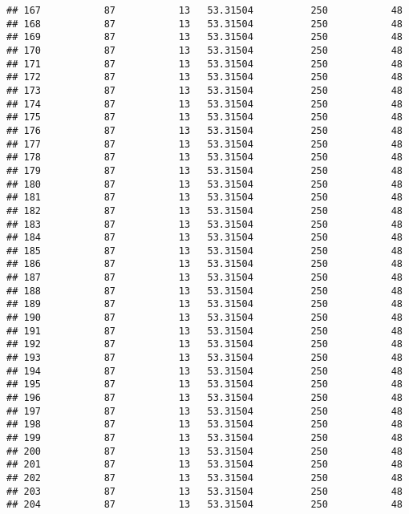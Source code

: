 \documentclass[]{article}
\begin{document}
\begin{verbatim}
## 167           87           13   53.31504          250           48
## 168           87           13   53.31504          250           48
## 169           87           13   53.31504          250           48
## 170           87           13   53.31504          250           48
## 171           87           13   53.31504          250           48
## 172           87           13   53.31504          250           48
## 173           87           13   53.31504          250           48
## 174           87           13   53.31504          250           48
## 175           87           13   53.31504          250           48
## 176           87           13   53.31504          250           48
## 177           87           13   53.31504          250           48
## 178           87           13   53.31504          250           48
## 179           87           13   53.31504          250           48
## 180           87           13   53.31504          250           48
## 181           87           13   53.31504          250           48
## 182           87           13   53.31504          250           48
## 183           87           13   53.31504          250           48
## 184           87           13   53.31504          250           48
## 185           87           13   53.31504          250           48
## 186           87           13   53.31504          250           48
## 187           87           13   53.31504          250           48
## 188           87           13   53.31504          250           48
## 189           87           13   53.31504          250           48
## 190           87           13   53.31504          250           48
## 191           87           13   53.31504          250           48
## 192           87           13   53.31504          250           48
## 193           87           13   53.31504          250           48
## 194           87           13   53.31504          250           48
## 195           87           13   53.31504          250           48
## 196           87           13   53.31504          250           48
## 197           87           13   53.31504          250           48
## 198           87           13   53.31504          250           48
## 199           87           13   53.31504          250           48
## 200           87           13   53.31504          250           48
## 201           87           13   53.31504          250           48
## 202           87           13   53.31504          250           48
## 203           87           13   53.31504          250           48
## 204           87           13   53.31504          250           48

\end{verbatim}
\end{document}
